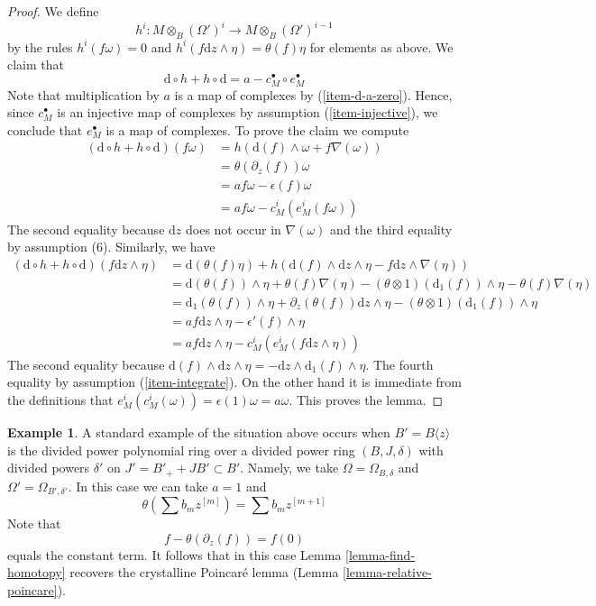 \documentclass{stacks-project}
\theoremstyle{plain}
\theoremstyle{definition}
\newtheorem{example}[subsection]{Example}
\theoremstyle{remark}
\numberwithin{equation}{subsection}
\begin{document}
\begin{proof}
\medskip\noindent
We define
$$
h^i : M \otimes_B (\Omega')^i \longrightarrow M \otimes_B (\Omega')^{i - 1}
$$
by the rules $h^i(f \omega) = 0$ and
$h^i(f \text{d}z \wedge \eta) = \theta(f) \eta$
for elements as above.  We claim that
$$
\text{d} \circ h + h \circ \text{d} = a - c_M^\bullet \circ e_M^\bullet
$$
Note that multiplication by $a$ is a map of complexes
by (\ref{item-d-a-zero}). Hence, since $c_M^\bullet$ is an injective map
of complexes by assumption (\ref{item-injective}), we conclude that
$e_M^\bullet$ is a map of complexes. To prove the claim we compute
\begin{align*}
(\text{d} \circ h + h \circ \text{d})(f \omega)
& =
h\left(\text{d}(f) \wedge \omega + f \nabla(\omega)\right)
\\
& =
\theta(\partial_z(f)) \omega
\\
& =
a f\omega - \epsilon(f)\omega 
\\
& =
a f \omega - c^i_M(e^i_M(f\omega))
\end{align*}
The second equality because $\text{d}z$ does not occur in $\nabla(\omega)$
and the third equality by assumption (6). Similarly, we have
\begin{align*}
(\text{d} \circ h + h \circ \text{d})(f \text{d}z \wedge \eta)
& =
\text{d}(\theta(f) \eta) +
h\left(\text{d}(f) \wedge \text{d}z \wedge \eta -
f \text{d}z \wedge \nabla(\eta)\right)
\\
& =
\text{d}(\theta(f)) \wedge \eta + \theta(f) \nabla(\eta)
- (\theta \otimes 1)(\text{d}_1(f)) \wedge \eta
- \theta(f) \nabla(\eta)
\\
& =
\text{d}_1(\theta(f)) \wedge \eta +
\partial_z(\theta(f)) \text{d}z \wedge \eta -
(\theta \otimes 1)(\text{d}_1(f)) \wedge \eta
\\
& =
a f \text{d}z \wedge \eta - \epsilon'(f) \wedge \eta \\
& = a f \text{d}z \wedge \eta - c^i_M(e^i_M(f \text{d}z \wedge \eta))
\end{align*}
The second equality because
$\text{d}(f) \wedge \text{d}z \wedge \eta =
- \text{d}z \wedge \text{d}_1(f) \wedge \eta$.
The fourth equality by assumption (\ref{item-integrate}).
On the other hand it is immediate from the definitions
that $e^i_M(c^i_M(\omega)) = \epsilon(1) \omega = a \omega$.
This proves the lemma.
\end{proof}

\begin{example}
\label{example-integrate}
A standard example of the situation above occurs when
$B' = B\langle z \rangle$ is the divided power polynomial ring
over a divided power ring $(B, J, \delta)$ with divided powers
$\delta'$ on $J' = B'_{+} + JB' \subset B'$. Namely, we take
$\Omega = \Omega_{B, \delta}$ and $\Omega' = \Omega_{B', \delta'}$.
In this case we can take $a = 1$ and
$$
\theta( \sum b_m z^{[m]} ) = \sum b_m z^{[m + 1]}
$$
Note that
$$
f - \theta(\partial_z(f)) = f(0)
$$
equals the constant term. It follows that in this case
Lemma \ref{lemma-find-homotopy}
recovers the crystalline Poincar\'e lemma
(Lemma \ref{lemma-relative-poincare}).
\end{example}
\end{document}
